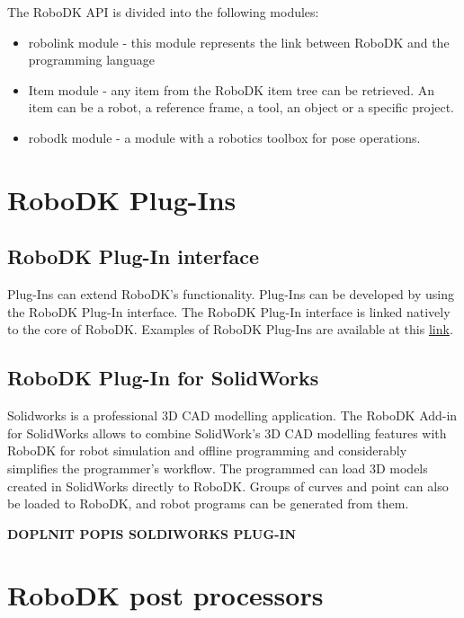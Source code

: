 The RoboDK API is divided into the following modules:

\begin{itemize}
    \item robolink module - this module represents the link between RoboDK and the programming language
    \item Item module - any item from the RoboDK item tree can be retrieved.  An item can be a robot, a reference frame, a tool, an object or a specific project.
    \item robodk module - a module with a robotics toolbox for pose operations.
\end{itemize}

\section{RoboDK Plug-Ins}

\subsection{RoboDK Plug-In interface}

Plug-Ins can extend RoboDK's functionality. Plug-Ins can be developed by using the RoboDK Plug-In interface. The RoboDK Plug-In interface is linked natively to the core of RoboDK. Examples of RoboDK Plug-Ins are available at this \href{https://github.com/RoboDK/Plug-In-Interface}{link}. 

\subsection{RoboDK Plug-In for SolidWorks}

Solidworks is a professional 3D CAD modelling application. The RoboDK Add-in for SolidWorks allows to combine SolidWork's 3D CAD modelling features with RoboDK for robot simulation and offline programming and considerably simplifies the programmer's workflow. The programmed can load 3D models created in SolidWorks directly to RoboDK. Groups of curves and point can also be loaded to RoboDK, and robot programs can be generated from them.

\textbf{DOPLNIT POPIS SOLDIWORKS PLUG-IN}

\section{RoboDK post processors}